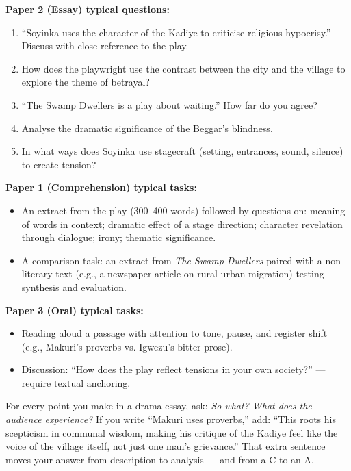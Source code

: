 \documentclass[11pt]{article}
\begin{document}
\begin{experience}
\textbf{Paper 2 (Essay) typical questions:}
\begin{enumerate}
\item ``Soyinka uses the character of the Kadiye to criticise religious hypocrisy.'' Discuss with close reference to the play.
\item How does the playwright use the contrast between the city and the village to explore the theme of betrayal?
\item ``The Swamp Dwellers is a play about waiting.'' How far do you agree?
\item Analyse the dramatic significance of the Beggar's blindness.
\item In what ways does Soyinka use stagecraft (setting, entrances, sound, silence) to create tension?
\end{enumerate}

\textbf{Paper 1 (Comprehension) typical tasks:}
\begin{itemize}
\item An extract from the play (300–400 words) followed by questions on: meaning of words in context; dramatic effect of a stage direction; character revelation through dialogue; irony; thematic significance.
\item A comparison task: an extract from \emph{The Swamp Dwellers} paired with a non-literary text (e.g., a newspaper article on rural-urban migration) testing synthesis and evaluation.
\end{itemize}

\textbf{Paper 3 (Oral) typical tasks:}
\begin{itemize}
\item Reading aloud a passage with attention to tone, pause, and register shift (e.g., Makuri's proverbs vs. Igwezu's bitter prose).
\item Discussion: ``How does the play reflect tensions in your own society?'' — require textual anchoring.
\end{itemize}
\end{experience}

\begin{savaistu}
For every point you make in a drama essay, ask: \emph{So what? What does the audience experience?} If you write ``Makuri uses proverbs,'' add: ``This roots his scepticism in communal wisdom, making his critique of the Kadiye feel like the voice of the village itself, not just one man's grievance.'' That extra sentence moves your answer from description to analysis — and from a C to an A.
\end{savaistu}
\end{document}
